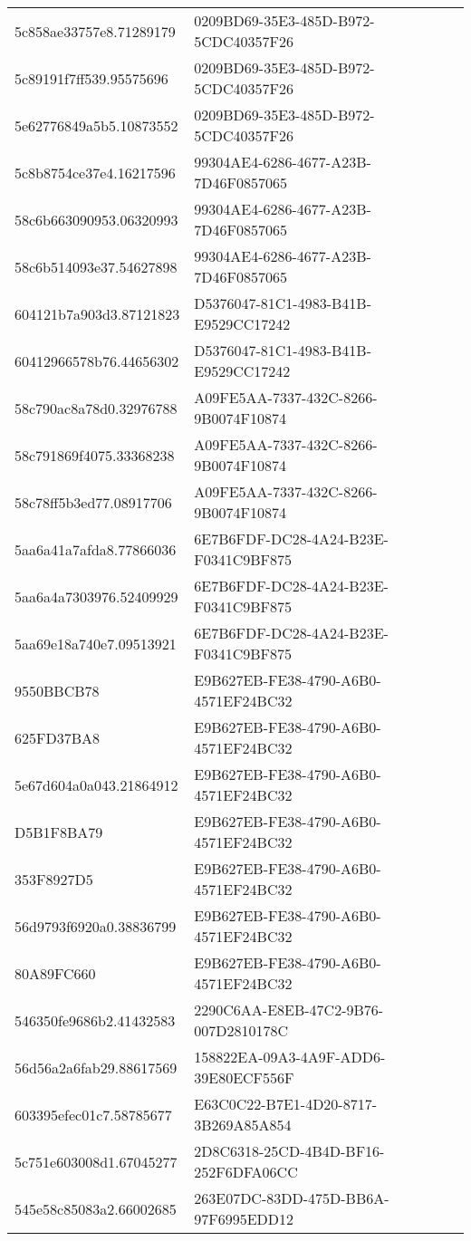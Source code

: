 \begin{tabular}{ll}
5c858ae33757e8.71289179 & 0209BD69-35E3-485D-B972-5CDC40357F26 \\
5c89191f7ff539.95575696 & 0209BD69-35E3-485D-B972-5CDC40357F26 \\
5e62776849a5b5.10873552 & 0209BD69-35E3-485D-B972-5CDC40357F26 \\
5c8b8754ce37e4.16217596 & 99304AE4-6286-4677-A23B-7D46F0857065 \\
58c6b663090953.06320993 & 99304AE4-6286-4677-A23B-7D46F0857065 \\
58c6b514093e37.54627898 & 99304AE4-6286-4677-A23B-7D46F0857065 \\
604121b7a903d3.87121823 & D5376047-81C1-4983-B41B-E9529CC17242 \\
60412966578b76.44656302 & D5376047-81C1-4983-B41B-E9529CC17242 \\
58c790ac8a78d0.32976788 & A09FE5AA-7337-432C-8266-9B0074F10874 \\
58c791869f4075.33368238 & A09FE5AA-7337-432C-8266-9B0074F10874 \\
58c78ff5b3ed77.08917706 & A09FE5AA-7337-432C-8266-9B0074F10874 \\
5aa6a41a7afda8.77866036 & 6E7B6FDF-DC28-4A24-B23E-F0341C9BF875 \\
5aa6a4a7303976.52409929 & 6E7B6FDF-DC28-4A24-B23E-F0341C9BF875 \\
5aa69e18a740e7.09513921 & 6E7B6FDF-DC28-4A24-B23E-F0341C9BF875 \\
9550BBCB78 & E9B627EB-FE38-4790-A6B0-4571EF24BC32 \\
625FD37BA8 & E9B627EB-FE38-4790-A6B0-4571EF24BC32 \\
5e67d604a0a043.21864912 & E9B627EB-FE38-4790-A6B0-4571EF24BC32 \\
D5B1F8BA79 & E9B627EB-FE38-4790-A6B0-4571EF24BC32 \\
353F8927D5 & E9B627EB-FE38-4790-A6B0-4571EF24BC32 \\
56d9793f6920a0.38836799 & E9B627EB-FE38-4790-A6B0-4571EF24BC32 \\
80A89FC660 & E9B627EB-FE38-4790-A6B0-4571EF24BC32 \\
546350fe9686b2.41432583 & 2290C6AA-E8EB-47C2-9B76-007D2810178C \\
56d56a2a6fab29.88617569 & 158822EA-09A3-4A9F-ADD6-39E80ECF556F \\
603395efec01c7.58785677 & E63C0C22-B7E1-4D20-8717-3B269A85A854 \\
5c751e603008d1.67045277 & 2D8C6318-25CD-4B4D-BF16-252F6DFA06CC \\
545e58c85083a2.66002685 & 263E07DC-83DD-475D-BB6A-97F6995EDD12 \\

\end{tabular}
